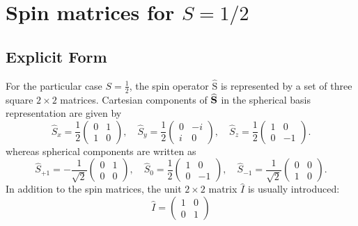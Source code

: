 \section{Spin matrices for $S=1 / 2$} \label{sec:2.5}
\subsection{Explicit Form}
For the particular case $S=\frac{1}{2}$, the spin operator $\widehat{\mathrm{S}}$ is represented by a set of three square $2 \times 2$ matrices. Cartesian components of $\widehat{\mathbf{S}}$ in the spherical basis representation are given by
\begin{equation}
\hat{S}_{x}=\frac{1}{2}\begin{pmatrix}
0 & 1  \label{eq:2:5:1}\\
1 & 0
\end{pmatrix}, \quad \hat{S}_{y}=\frac{1}{2}\begin{pmatrix}
0 & -i \\
i & 0
\end{pmatrix}, \quad \hat{S}_{z}=\frac{1}{2}\begin{pmatrix}
1 & 0 \\
0 & -1
\end{pmatrix} .
\end{equation}
whereas spherical components are written as
\begin{equation}
\widehat{S}_{+1}=-\frac{1}{\sqrt{2}}\begin{pmatrix}
0 & 1  \label{eq:2:5:2}\\
0 & 0
\end{pmatrix}, \quad \widehat{S}_{0}=\frac{1}{2}\begin{pmatrix}
1 & 0 \\
0 & -1
\end{pmatrix}, \quad \widehat{S}_{-1}=\frac{1}{\sqrt{2}}\begin{pmatrix}
0 & 0 \\
1 & 0
\end{pmatrix} .
\end{equation}
In addition to the spin matrices, the unit $2 \times 2$ matrix $\hat{I}$ is usually introduced:
\begin{equation}
\widehat{I}=\begin{pmatrix}
1 & 0  \label{eq:2:5:3}\\
0 & 1
\end{pmatrix}
\end{equation}
